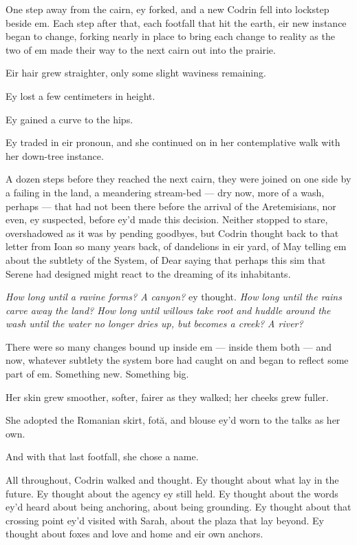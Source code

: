 One step away from the cairn, ey forked, and a new Codrin fell into lockstep beside em. Each step after that, each footfall that hit the earth, eir new instance began to change, forking nearly in place to bring each change to reality as the two of em made their way to the next cairn out into the prairie.

Eir hair grew straighter, only some slight waviness remaining.

Ey lost a few centimeters in height.

Ey gained a curve to the hips.

Ey traded in eir pronoun, and she continued on in her contemplative walk with her down-tree instance.

A dozen steps before they reached the next cairn, they were joined on one side by a failing in the land, a meandering stream-bed — dry now, more of a wash, perhaps — that had not been there before the arrival of the Aretemisians, nor even, ey suspected, before ey'd made this decision. Neither stopped to stare, overshadowed as it was by pending goodbyes, but Codrin thought back to that letter from Ioan so many years back, of dandelions in eir yard, of May telling em about the subtlety of the System, of Dear saying that perhaps this sim that Serene had designed might react to the dreaming of its inhabitants.

\emph{How long until a ravine forms? A canyon?} ey thought. \emph{How long until the rains carve away the land? How long until willows take root and huddle around the wash until the water no longer dries up, but becomes a creek? A river?}

There were so many changes bound up inside em — inside them both — and now, whatever subtlety the system bore had caught on and began to reflect some part of em. Something new. Something big.

Her skin grew smoother, softer, fairer as they walked; her cheeks grew fuller.

She adopted the Romanian skirt, fotă, and blouse ey'd worn to the talks as her own.

And with that last footfall, she chose a name.

All throughout, Codrin walked and thought. Ey thought about what lay in the future. Ey thought about the agency ey still held. Ey thought about the words ey'd heard about being anchoring, about being grounding. Ey thought about that crossing point ey'd visited with Sarah, about the plaza that lay beyond. Ey thought about foxes and love and home and eir own anchors.

